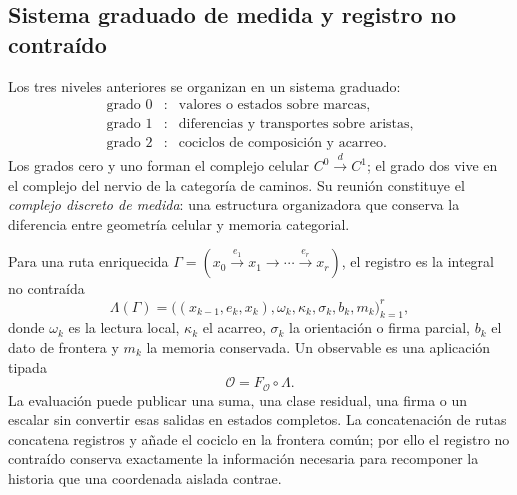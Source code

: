 \subsection{Sistema graduado de medida y registro no contraído}

Los tres niveles anteriores se organizan en un sistema graduado:
\[
 \boxed{
 \begin{array}{ccl}
 \text{grado }0&:&\text{valores o estados sobre marcas},\\
 \text{grado }1&:&\text{diferencias y transportes sobre aristas},\\
 \text{grado }2&:&\text{cociclos de composición y acarreo}.
 \end{array}}
\]
Los grados cero y uno forman el complejo celular
\(C^0\xrightarrow d C^1\); el grado dos vive en el complejo del nervio de la
categoría de caminos. Su reunión constituye el \emph{complejo discreto de
medida}: una estructura organizadora que conserva la diferencia entre
geometría celular y memoria categorial.

Para una ruta enriquecida
\(\Gamma=(x_0\xrightarrow{e_1}x_1\to\cdots\xrightarrow{e_r}x_r)\), el
registro es la integral no contraída
\begin{equation}
 \Lambda(\Gamma)
 =\bigl((x_{k-1},e_k,x_k),\omega_k,\kappa_k,\sigma_k,b_k,m_k\bigr)_{k=1}^{r},
 \label{eq:ledger-integral-no-contraida-rev2}
\end{equation}
donde \(\omega_k\) es la lectura local, \(\kappa_k\) el acarreo, \(\sigma_k\)
la orientación o firma parcial, \(b_k\) el dato de frontera y \(m_k\) la
memoria conservada. Un observable es una aplicación tipada
\[
 \mathcal O=F_{\mathcal O}\circ\Lambda.
\]
La evaluación puede publicar una suma, una clase residual, una firma o un
escalar sin convertir esas salidas en estados completos. La concatenación de
rutas concatena registros y añade el cociclo en la frontera común; por ello el
registro no contraído conserva exactamente la información necesaria para recomponer la
historia que una coordenada aislada contrae.

